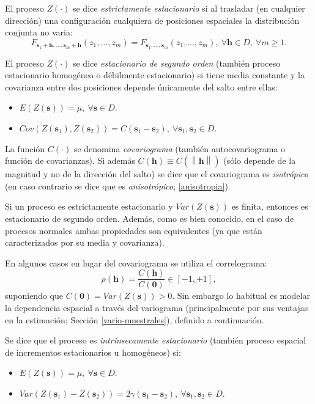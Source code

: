 \documentclass[
  spanish,
]{book}
\theoremstyle{break}
\begin{document}
El proceso \(Z(\cdot)\) se dice \emph{estrictamente estacionario} si al trasladar (en cualquier dirección) una configuración cualquiera de posiciones espaciales la distribución conjunta no varia:
\[F_{\mathbf{s}_1 +\mathbf{h}, \ldots,\mathbf{s}_m +\mathbf{h}}(z_1, \ldots, z_m) = F_{\mathbf{s}_1, \ldots, \mathbf{s}_m}(z_1, \ldots, z_m),\ \forall \mathbf{h}\in D,\ \forall m\geq 1.\]

El proceso \(Z(\cdot)\) se dice \emph{estacionario de segundo orden} (también proceso estacionario homogéneo o débilmente estacionario) si tiene media constante y la covarianza entre dos posiciones depende únicamente del salto entre ellas:

\begin{itemize}
\item
  \(E(Z(\mathbf{s}))=\mu,\ \forall \mathbf{s}\in D\).
\item
  \(Cov(Z(\mathbf{s}_1), Z(\mathbf{s}_2)) = C(\mathbf{s}_1 -\mathbf{s}_2),\ \forall \mathbf{s}_1 ,\mathbf{s}_2 \in D\).
\end{itemize}

La función \(C(\cdot)\) se denomina \emph{covariograma} (también autocovariograma o función de covarianzas).
Si además \(C(\mathbf{h}) \equiv C(\left\| \mathbf{h}\right\|)\) (sólo depende de la magnitud y no de la dirección del salto) se dice que el covariograma es \emph{isotrópico} (en caso contrario se dice que es \emph{anisotrópico}; \ref{anisotropia}).

Si un proceso es estrictamente estacionario y \(Var(Z(\mathbf{s}))\) es finita, entonces es estacionario de segundo orden.
Además, como es bien conocido, en el caso de procesos normales ambas propiedades son equivalentes (ya que están caracterizados por su media y covarianza).

En algunos casos en lugar del covariograma se utiliza el correlograma:
\[\rho (\mathbf{h}) = \dfrac{C(\mathbf{h})}{C(\mathbf{0})} \in \left[-1,+1\right],\]
suponiendo que \(C(\mathbf{0}) = Var(Z(\mathbf{s})) >0\).
Sin embargo lo habitual es modelar la dependencia espacial a través del variograma (principalmente por sus ventajas en la estimación; Sección \ref{vario-muestrales}), definido a continuación.

Se dice que el proceso es \emph{intrínsecamente estacionario} (también proceso espacial de incrementos estacionarios u homogéneos) si:

\begin{itemize}
\item
  \(E(Z(\mathbf{s}))=\mu,\ \forall \mathbf{s}\in D\).
\item
  \(Var(Z(\mathbf{s}_1)-Z(\mathbf{s}_2)) = 2\gamma (\mathbf{s}_1 - \mathbf{s}_2),\ \forall \mathbf{s}_1 ,\mathbf{s}_2 \in D\).
\end{itemize}
\end{document}

